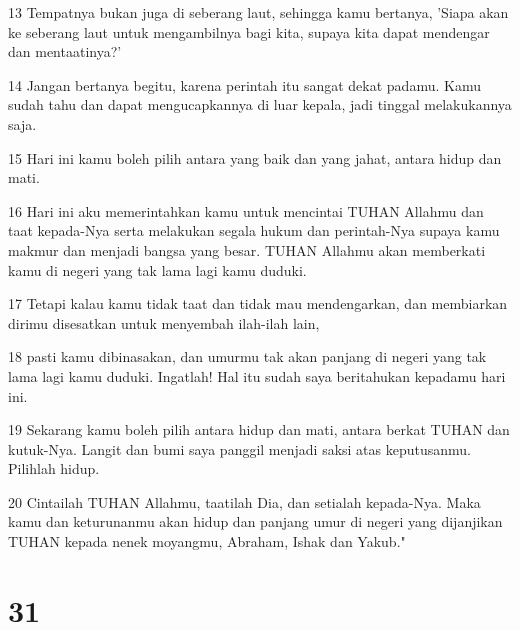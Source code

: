 \par 13 Tempatnya bukan juga di seberang laut, sehingga kamu bertanya, 'Siapa akan ke seberang laut untuk mengambilnya bagi kita, supaya kita dapat mendengar dan mentaatinya?'
\par 14 Jangan bertanya begitu, karena perintah itu sangat dekat padamu. Kamu sudah tahu dan dapat mengucapkannya di luar kepala, jadi tinggal melakukannya saja.
\par 15 Hari ini kamu boleh pilih antara yang baik dan yang jahat, antara hidup dan mati.
\par 16 Hari ini aku memerintahkan kamu untuk mencintai TUHAN Allahmu dan taat kepada-Nya serta melakukan segala hukum dan perintah-Nya supaya kamu makmur dan menjadi bangsa yang besar. TUHAN Allahmu akan memberkati kamu di negeri yang tak lama lagi kamu duduki.
\par 17 Tetapi kalau kamu tidak taat dan tidak mau mendengarkan, dan membiarkan dirimu disesatkan untuk menyembah ilah-ilah lain,
\par 18 pasti kamu dibinasakan, dan umurmu tak akan panjang di negeri yang tak lama lagi kamu duduki. Ingatlah! Hal itu sudah saya beritahukan kepadamu hari ini.
\par 19 Sekarang kamu boleh pilih antara hidup dan mati, antara berkat TUHAN dan kutuk-Nya. Langit dan bumi saya panggil menjadi saksi atas keputusanmu. Pilihlah hidup.
\par 20 Cintailah TUHAN Allahmu, taatilah Dia, dan setialah kepada-Nya. Maka kamu dan keturunanmu akan hidup dan panjang umur di negeri yang dijanjikan TUHAN kepada nenek moyangmu, Abraham, Ishak dan Yakub."

\chapter{31}

